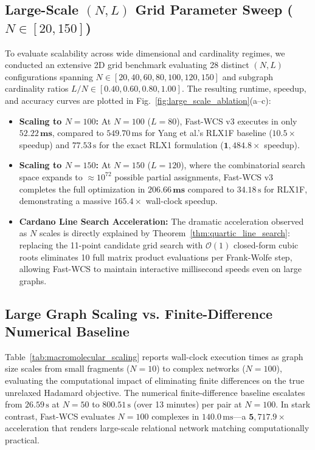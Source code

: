 \documentclass[conference]{IEEEtran}
\begin{document}
\subsection{Large-Scale $(N, L)$ Grid Parameter Sweep ($N \in [20, 150]$)}

To evaluate scalability across wide dimensional and cardinality regimes, we conducted an extensive 2D grid benchmark evaluating 28 distinct $(N, L)$ configurations spanning $N \in [20, 40, 60, 80, 100, 120, 150]$ and subgraph cardinality ratios $L/N \in [0.40, 0.60, 0.80, 1.00]$. The resulting runtime, speedup, and accuracy curves are plotted in Fig.~\ref{fig:large_scale_ablation}(a--c):

\begin{itemize}
    \item \textbf{Scaling to $N = 100$:} At $N = 100$ ($L = 80$), Fast-WCS v3 executes in only $\mathbf{52.22\,\text{ms}}$, compared to $549.70\,\text{ms}$ for Yang et al.'s RLX1F baseline ($\mathbf{10.5\times}$ speedup) and $77.53\,\text{s}$ for the exact RLX1 formulation ($\mathbf{1,484.8\times}$ speedup).
    \item \textbf{Scaling to $N = 150$:} At $N = 150$ ($L = 120$), where the combinatorial search space expands to $\approx 10^{72}$ possible partial assignments, Fast-WCS v3 completes the full optimization in $\mathbf{206.66\,\text{ms}}$ compared to $34.18\,\text{s}$ for RLX1F, demonstrating a massive $\mathbf{165.4\times}$ wall-clock speedup.
    \item \textbf{Cardano Line Search Acceleration:} The dramatic acceleration observed as $N$ scales is directly explained by Theorem~\ref{thm:quartic_line_search}: replacing the 11-point candidate grid search with $\mathcal{O}(1)$ closed-form cubic roots eliminates 10 full matrix product evaluations per Frank-Wolfe step, allowing Fast-WCS to maintain interactive millisecond speeds even on large graphs.
\end{itemize}

\subsection{Large Graph Scaling vs. Finite-Difference Numerical Baseline}

Table~\ref{tab:macromolecular_scaling} reports wall-clock execution times as graph size scales from small fragments ($N = 10$) to complex networks ($N = 100$), evaluating the computational impact of eliminating finite differences on the true unrelaxed Hadamard objective. The numerical finite-difference baseline escalates from $26.59\,\text{s}$ at $N = 50$ to $800.51\,\text{s}$ (over 13 minutes) per pair at $N = 100$. In stark contrast, Fast-WCS evaluates $N = 100$ complexes in $140.0\,\text{ms}$---a $\mathbf{5,717.9\times}$ acceleration that renders large-scale relational network matching computationally practical.
\end{document}
